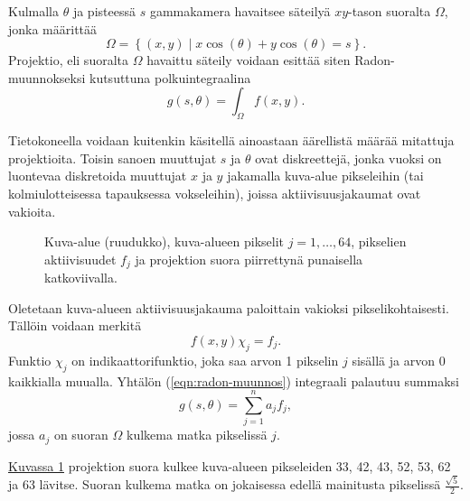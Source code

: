 Kulmalla $\theta$ ja pisteessä $s$ gammakamera havaitsee säteilyä $xy$-tason suoralta $\Omega$, jonka määrittää
\begin{equation*}
    \Omega=\left\{ (x, y) \mid x\cos(\theta)+y\cos(\theta)=s \right\}.
\end{equation*}
Projektio, eli suoralta $\Omega$ havaittu säteily voidaan esittää siten Radon-muunnokseksi kutsuttuna polkuintegraalina\cite{radon_determination_1986, bruyant_analytic_2002}
\begin{equation}\label{eqn:radon-muunnos}
    g(s, \theta)=\int_{\Omega}f(x, y).
\end{equation}

Tietokoneella voidaan kuitenkin käsitellä ainoastaan äärellistä määrää mitattuja projektioita. Toisin sanoen muuttujat $s$ ja $\theta$ ovat diskreettejä, jonka vuoksi on luontevaa diskretoida muuttujat $x$ ja $y$ jakamalla kuva-alue pikseleihin (tai kolmiulotteisessa tapauksessa vokseleihin), joissa aktiivisuusjakaumat ovat vakioita.

\begin{figure}[H]
    \centering
    \captionsetup{width=.9\textwidth}
    
    \caption{Kuva-alue (ruudukko), kuva-alueen pikselit $j=1,\ldots,64$, pikselien aktiivisuudet $f_j$ ja projektion suora piirrettynä punaisella katkoviivalla.}
    \label{fig:diskreetti-projektio}
\end{figure}

Oletetaan kuva-alueen aktiivisuusjakauma paloittain vakioksi pikselikohtaisesti. Tällöin voidaan merkitä
\begin{equation*}
    f(x, y)\chi_{j}=f_j.
\end{equation*}
Funktio $\chi_j$ on indikaattorifunktio, joka saa arvon 1 pikselin $j$ sisällä ja arvon 0 kaikkialla muualla. Yhtälön (\ref{eqn:radon-muunnos}) integraali palautuu summaksi
\begin{equation}\label{eqn:diskreetti-radon-muunnos}
    g(s, \theta)=\sum_{j=1}^{n}a_{j}f_{j},
\end{equation}
jossa $a_j$ on suoran $\Omega$ kulkema matka pikselissä $j$. 

\hyperref[fig:diskreetti-projektio]{Kuvassa \ref*{fig:diskreetti-projektio}} projektion suora kulkee kuva-alueen pikseleiden 33, 42, 43, 52, 53, 62 ja 63 lävitse. Suoran kulkema matka on jokaisessa edellä mainitusta pikselissä $\frac{\sqrt{5}}{2}$.

